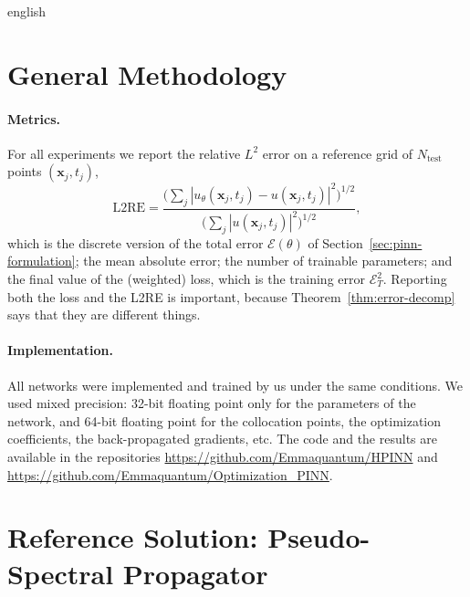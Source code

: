 \documentclass[12pt,letterpaper,twoside]{book}
\newcommand{\abs}[1]{\left\lvert #1 \right\rvert}
\newif\ifreviewmode
\newcommand{\revtag}[2]{\ifreviewmode{\color{red!70!black}\textsf{\footnotesize[#1#2]}}\fi}
\newcommand{\verificar}[1]{\revtag{VERIFICAR}{: #1}}
\begin{document}
\begin{hyphenrules}{english}
\section{General Methodology}\label{sec:exp-methodology}

\paragraph{Metrics.}
For all experiments we report the relative $L^2$ error on a reference grid of
$N_{\mathrm{test}}$ points $(\mathbf{x}_j,t_j)$,
\begin{equation}
  \mathrm{L2RE}=\frac{\big(\sum_j\abs{u_\theta(\mathbf{x}_j,t_j)-u(\mathbf{x}_j,t_j)}^2\big)^{1/2}}{\big(\sum_j\abs{u(\mathbf{x}_j,t_j)}^2\big)^{1/2}},
  \label{eq:l2re}
\end{equation}
which is the discrete version of the total error $\mathcal{E}(\theta)$ of Section~\ref{sec:pinn-formulation};
the mean absolute error; the number of trainable parameters; and the final value of the (weighted)
loss, which is the training error $\mathcal{E}_T^2$. Reporting both the loss and the L2RE is important,
because Theorem~\ref{thm:error-decomp} says that they are different things.

\paragraph{Implementation.}
All networks were implemented and trained by us under the same conditions. We used mixed precision:
32-bit floating point only for the parameters of the network, and 64-bit floating point for the
collocation points, the optimization coefficients, the back-propagated gradients, etc. The code and the
results are available in the repositories
\url{https://github.com/Emmaquantum/HPINN} and \url{https://github.com/Emmaquantum/Optimization_PINN}.
\verificar{framework (PyTorch/JAX), hardware (GPU), training time and number of random seeds per
configuration}

\section{Reference Solution: Pseudo-Spectral Propagator}\label{sec:reference-solution}


\end{hyphenrules}
\end{document}
